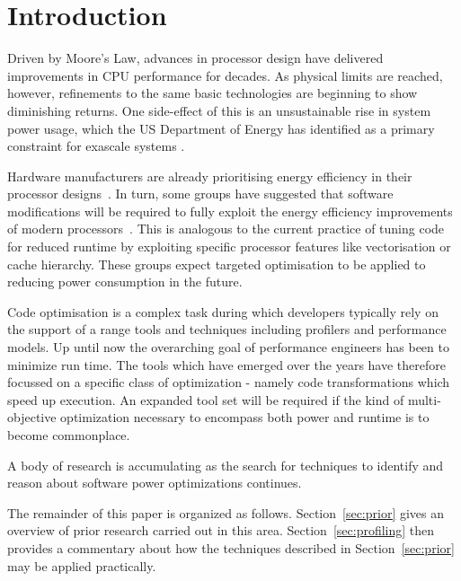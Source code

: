 \section*{Introduction}
Driven by Moore's Law, advances in processor design have delivered improvements in CPU performance for decades. As physical limits are reached, however, refinements to the same basic technologies are beginning to show diminishing returns. One side-effect of this is an unsustainable rise in system power usage, which the US Department of Energy has identified as a primary constraint for exascale systems \cite{shalf:2011aa}.

Hardware manufacturers are already prioritising energy efficiency in their processor designs~\cite{kurd:2014aa}. In turn, some groups have suggested that software modifications will be required to fully exploit the energy efficiency improvements of modern processors~\cite{shao:2013aa}. This is analogous to the current practice of tuning code for reduced runtime by exploiting specific processor features like vectorisation or cache hierarchy. These groups expect targeted optimisation to be applied to reducing power consumption in the future.

Code optimisation is a complex task during which developers typically rely on the support of a range tools and techniques including profilers and performance models. Up until now the overarching goal of performance engineers has been to minimize run time. The tools which have emerged over the years have therefore focussed on a specific class of optimization - namely code transformations which speed up execution. An expanded tool set will be required if the kind of multi-objective optimization necessary to encompass both power and runtime is to become commonplace.

A body of research is accumulating as the search for techniques to identify and reason about software power optimizations continues.

The remainder of this paper is organized as follows. Section~\ref{sec:prior} gives an overview of prior research carried out in this area. Section~\ref{sec:profiling} then provides a commentary about how the techniques described in Section~\ref{sec:prior} may be applied practically.
